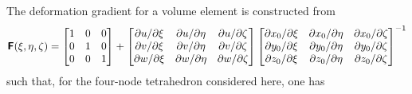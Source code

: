 The deformation gradient for a volume element is constructed from
\small
\begin{equation}
\boldsymbol{\mathsf{F}} ( \xi , \eta , \zeta ) = \begin{bmatrix} 1 & 0 & 0 \\
0 & 1 & 0 \\ 0 & 0 & 1 \end{bmatrix} + \begin{bmatrix}
\partial u / \partial \xi & \partial u / \partial \eta & \partial u / \partial \zeta \\
\partial v / \partial \xi & \partial v / \partial \eta & \partial v / \partial \zeta \\
\partial w / \partial \xi & \partial w / \partial \eta & \partial w / \partial \zeta
\end{bmatrix} \begin{bmatrix}
\partial x_0 / \partial \xi & \partial x_0 / \partial \eta & \partial x_0 / \partial \zeta \\
\partial y_0 / \partial \xi & \partial y_0 / \partial \eta & \partial y_0 / \partial \zeta \\
\partial z_0 / \partial \xi & \partial z_0 / \partial \eta & \partial z_0 / \partial \zeta
\end{bmatrix}^{-1}
\end{equation}
\normalsize
such that, for the four-node tetrahedron considered here, one has

